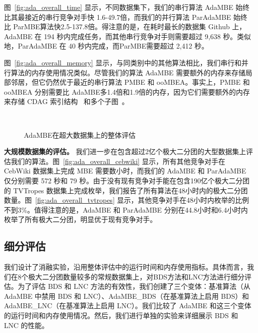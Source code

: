 图~\ref{fig:ada_overall_time} 显示，不同数据集下，我们的串行算法 AdaMBE 始终比其最接近的串行竞争对手快 1.6-49.7倍，而我们的并行算法 ParAdaMBE 始终比 ParMBE算法快2.5-137.8倍。得注意的是，在耗时最长的数据集 Github 上，AdaMBE 在 194 秒内完成任务，而其他串行竞争对手则需要超过 9,638 秒。类似地，ParAdaMBE 在 40 秒内完成，而ParMBE需要超过 2,412 秒。

图~\ref{fig:ada_overall_memory} 显示，与同类别中的其他算法相比，我们串行和并行算法的内存使用情况类似。尽管我们的算法 AdaMBE 需要额外的内存来存储局部邻居，但它仍然优于最近的串行算法 PMBE 和 ooMBEA。事实上，PMBE 和 ooMBEA 分别需要比 AdaMBE多1.4倍和1.9倍的内存，因为它们需要额外的内存来存储 CDAG 索引结构~\cite{PMBE20} 和多个子图~\cite{ooMBE22}。


\begin{figure} [H]
  \centering
	\\

  \caption{AdaMBE在超大数据集上的整体评估}
  \label{fig:ada_overall_large}
\end{figure}


\textbf{大规模数据集的评估。} 我们进一步在包含超过2亿个极大二分团的大型数据集上评估我们的算法。图~\ref{fig:ada_overall_cebwiki} 显示，所有其他竞争对手在 CebWiki 数据集上完成 MBE 需要数小时，而我们的 AdaMBE 和 ParAdaMBE 仅分别需要 572 秒和 79 秒。由于没有现有竞争对手能在包含190亿个极大二分团的 TVTropes 数据集上完成枚举，我们报告了所有算法在48小时内的极大二分团数量。图~\ref{fig:ada_overall_tvtropes} 显示，其他竞争对手在48小时内枚举的比例不到3\%。值得注意的是，AdaMBE 和 ParAdaMBE 分别在44.8小时和6.4小时内枚举了所有极大二分团，明显优于现有竞争对手。


\subsection{细分评估}

我们设计了消融实验，沿用整体评估中的运行时间和内存使用指标。具体而言，我们在8个极大二分团数量较多的常规数据集上，对BDS方法和LNC方法进行细分评估。为了评估 BDS 和 LNC 方法的有效性，我们创建了三个变体：基准算法（从 AdaMBE 中禁用 BDS 和 LNC）、AdaMBE\_BDS（在基准算法上启用 BDS）和 AdaMBE\_LNC（在基准算法上启用 LNC）。我们比较了 AdaMBE 和这三个变体的运行时间和内存使用情况。然后，我们进行单独的实验来详细展示 BDS 和 LNC 的性能。

